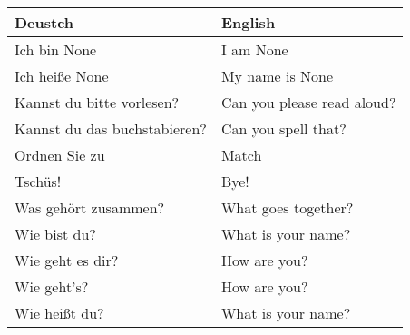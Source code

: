 \documentclass{article}
\renewcommand{\arraystretch}{1}
\begin{document}
\begin{minipage}{0.48\textwidth}
    \centering
    \renewcommand{\arraystretch}{1.5}
    \begin{tabular}{|>{\raggedright\arraybackslash}p{3.5cm}|>{\raggedright\arraybackslash}p{3.5cm}|}
        \hline
        \rowcolor{gray!20} \textbf{Deustch} & \textbf{English} \\
        \hline
        Ich bin None & I am None \\\hline
        Ich hei\ss{}e None & My name is None \\\hline
        Kannst du bitte vorlesen? &  Can you please read aloud? \\\hline
        Kannst du das buchstabieren? & Can you spell that? \\\hline
        Ordnen Sie zu & Match \\\hline
        Tschüs! & Bye! \\\hline
        Was gehört zusammen? & What goes together? \\\hline
        Wie bist du? & What is your name? \\\hline
        Wie geht es dir? &  How are you? \\\hline
        Wie geht's? &  How are you? \\\hline
        Wie hei\ss{}t du? & What is your name? \\\hline
    \end{tabular}
\end{minipage}
\end{document}
